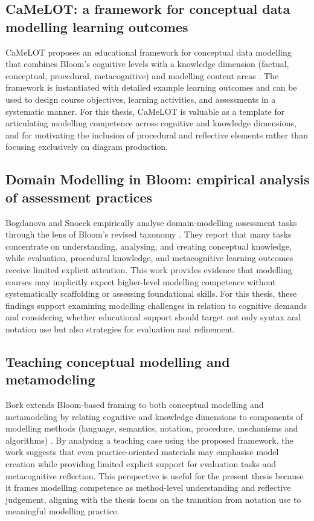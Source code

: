 \subsection{CaMeLOT: a framework for conceptual data modelling learning outcomes}
\label{subsec:rw_camelot}

CaMeLOT proposes an educational framework for conceptual data modelling that combines Bloom's cognitive levels with a knowledge dimension (factual, conceptual, procedural, metacognitive) and modelling content areas \cite{bogdanova2019camelot}. The framework is instantiated with detailed example learning outcomes and can be used to design course objectives, learning activities, and assessments in a systematic manner. For this thesis, CaMeLOT is valuable as a template for articulating modelling competence across cognitive and knowledge dimensions, and for motivating the inclusion of procedural and reflective elements rather than focusing exclusively on diagram production.

\subsection{Domain Modelling in Bloom: empirical analysis of assessment practices}
\label{subsec:rw_domain_bloom}

Bogdanova and Snoeck empirically analyse domain-modelling assessment tasks through the lens of Bloom's revised taxonomy \cite{bogdanova2017domain}. They report that many tasks concentrate on understanding, analysing, and creating conceptual knowledge, while evaluation, procedural knowledge, and metacognitive learning outcomes receive limited explicit attention. This work provides evidence that modelling courses may implicitly expect higher-level modelling competence without systematically scaffolding or assessing foundational skills. For this thesis, these findings support examining modelling challenges in relation to cognitive demands and considering whether educational support should target not only syntax and notation use but also strategies for evaluation and refinement.

\subsection{Teaching conceptual modelling and metamodeling}
\label{subsec:rw_bork_framework}

Bork extends Bloom-based framing to both conceptual modelling and metamodeling by relating cognitive and knowledge dimensions to components of modelling methods (language, semantics, notation, procedure, mechanisms and algorithms) \cite{bork2019framework}. By analysing a teaching case using the proposed framework, the work suggests that even practice-oriented materials may emphasise model creation while providing limited explicit support for evaluation tasks and metacognitive reflection. This perspective is useful for the present thesis because it frames modelling competence as method-level understanding and reflective judgement, aligning with the thesis focus on the transition from notation use to meaningful modelling practice.

